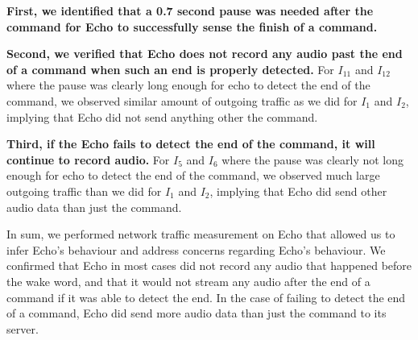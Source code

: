 \textbf{First, we identified that a 0.7 second pause was needed after the command for Echo to successfully sense the finish of a command.}  

\textbf{Second, we verified that Echo does not record any audio past the end of a command when such an end is properly detected.} For $I_{11}$ and $I_{12}$ where the pause was clearly long enough for echo to detect the end of the command, we observed similar amount of outgoing traffic as we did for $I_{1}$ and $I_{2}$, implying that Echo did not send anything other the command.

\textbf{Third, if the Echo fails to detect the end of the command, it will continue to record audio.} For $I_{5}$ and $I_{6}$ where the pause was clearly not long enough for echo to detect the end of the command, we observed much large outgoing traffic than we did for $I_{1}$ and $I_{2}$, implying that Echo did send other audio data than just the command.

In sum, we performed network traffic measurement on Echo that allowed us to infer Echo's behaviour and address concerns regarding Echo's behaviour. We confirmed that Echo in most cases did not record any audio that happened before the wake word, and that it would not stream any audio after the end of a command if it was able to detect the end. In the case of failing to detect the end of a command, Echo did send more audio data than just the command to its server.
